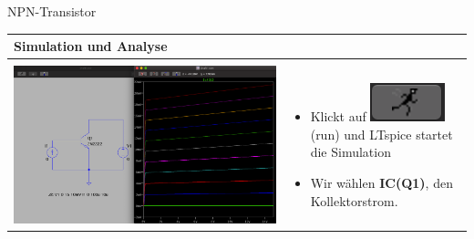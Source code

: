 \begin{frame}[t]{NPN-Transistor}

  \begin{spacing}{0.9} \begin{tiny}
      \begin{table}[h!]
        \begin{tabular}{p{5cm} p{5cm}}
          \hline
          \textbf{Simulation und Analyse} & \\
          \hline                            \\
          \begin{minipage}{.5\textwidth}
            \includegraphics[width=\linewidth]{pictures/analysis_3.png}
          \end{minipage}
                                          &
          \begin{minipage}{.5\textwidth}
            \begin{itemize}
              \item Klickt auf \includegraphics[scale=0.3]{pictures/run.png} (run) und LTspice startet die Simulation
              \item Wir wählen \textbf{IC(Q1)}, den Kollektorstrom.
            \end{itemize}
          \end{minipage}
          \\
        \end{tabular}
      \end{table}
    \end{tiny} \end{spacing}


\end{frame}
